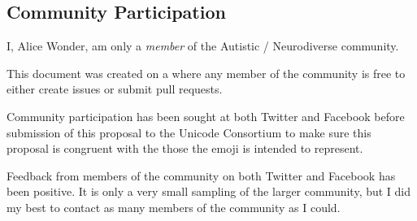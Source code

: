 \subsection*{Community Participation}

I, Alice Wonder, am only a \emph{member} of the Autistic / Neurodiverse community.

This document was created on a
where any member of the community is free to either create issues or submit pull
requests.

Community participation has been sought at both Twitter and Facebook
before submission of this proposal to the Unicode Consortium to make sure this proposal is
congruent with the those the emoji is intended to represent.

Feedback from members of the community on both Twitter and Facebook has been positive. It
is only a very small sampling of the larger community, but I did my best to contact as
many members of the community as I could.

